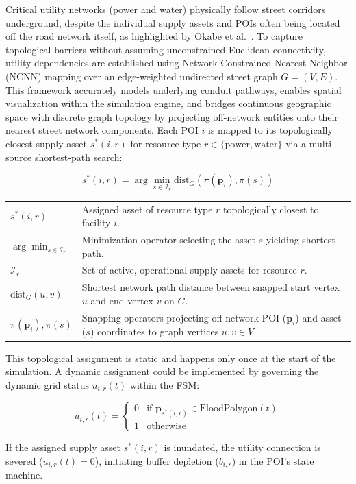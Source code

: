 Critical utility networks (power and water) physically follow street corridors underground, despite the individual supply assets and POIs often being located off the road network itself, as highlighted by Okabe et al.\ \cite{okabe2012}.
To capture topological barriers without assuming unconstrained Euclidean connectivity, utility dependencies are established using Network-Constrained Nearest-Neighbor (NCNN) mapping over an edge-weighted undirected street graph $G = (V, E)$.
This framework accurately models underlying conduit pathways, enables spatial visualization within the simulation engine, and bridges continuous geographic space with discrete graph topology by projecting off-network entities onto their nearest street network components.
Each POI $i$ is mapped to its topologically closest supply asset $s^*(i, r)$ for resource type $r \in \{\text{power}, \text{water}\}$ via a multi-source shortest-path search:


\begin{equation}
    s^*(i, r) = \arg\min_{s \in \mathcal{I}_r} \text{dist}_G\left(\pi(\mathbf{p}_i), \pi(s)\right)\label{eq:ncnn}
\end{equation}

\noindent
\begin{tabularx}{\textwidth}{@{}l X@{}}
$s^*(i, r)$ & Assigned asset of resource type $r$ topologically closest to facility $i$. \\
$\arg\min_{s \in \mathcal{I}_r}$ & Minimization operator selecting the asset $s$ yielding shortest path. \\
$\mathcal{I}_r$ & Set of active, operational supply assets for resource $r$. \\
$\text{dist}_G(u, v)$ & Shortest network path distance between snapped start vertex $u$ and end vertex $v$ on $G$. \\
$\pi(\mathbf{p}_i), \pi(s)$ & Snapping operators projecting off-network POI ($\mathbf{p}_i$) and asset ($s$) coordinates to graph vertices $u, v \in V$
\end{tabularx}

\vspace{7mm} \noindent
This topological assignment is static and happens only once at the start of the simulation.
A dynamic assignment could be implemented by governing the dynamic grid status $u_{i,r}(t)$ within the FSM:

\begin{equation}
    u_{i,r}(t) = \begin{cases}
                     0 & \text{if } \mathbf{p}_{s^*(i,r)} \in \text{FloodPolygon}(t) \\
                     1 & \text{otherwise}
    \end{cases}\label{eq:u_i_r}
\end{equation}

\noindent
If the assigned supply asset $s^*(i, r)$ is inundated, the utility connection is severed ($u_{i,r}(t) = 0$), initiating buffer depletion ($b_{i,r}$) in the POI's state machine.
